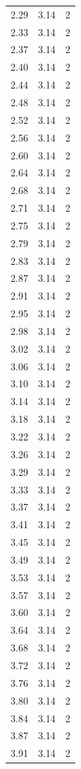 \begin{longtable}{lrr}
  2.29 & 3.14 & 2 \\
  2.33 & 3.14 & 2 \\
  2.37 & 3.14 & 2 \\
  2.40 & 3.14 & 2 \\
  2.44 & 3.14 & 2 \\
  2.48 & 3.14 & 2 \\
  2.52 & 3.14 & 2 \\
  2.56 & 3.14 & 2 \\
  2.60 & 3.14 & 2 \\
  2.64 & 3.14 & 2 \\
  2.68 & 3.14 & 2 \\
  2.71 & 3.14 & 2 \\
  2.75 & 3.14 & 2 \\
  2.79 & 3.14 & 2 \\
  2.83 & 3.14 & 2 \\
  2.87 & 3.14 & 2 \\
  2.91 & 3.14 & 2 \\
  2.95 & 3.14 & 2 \\
  2.98 & 3.14 & 2 \\
  3.02 & 3.14 & 2 \\
  3.06 & 3.14 & 2 \\
  3.10 & 3.14 & 2 \\
  3.14 & 3.14 & 2 \\
  3.18 & 3.14 & 2 \\
  3.22 & 3.14 & 2 \\
  3.26 & 3.14 & 2 \\
  3.29 & 3.14 & 2 \\
  3.33 & 3.14 & 2 \\
  3.37 & 3.14 & 2 \\
  3.41 & 3.14 & 2 \\
  3.45 & 3.14 & 2 \\
  3.49 & 3.14 & 2 \\
  3.53 & 3.14 & 2 \\
  3.57 & 3.14 & 2 \\
  3.60 & 3.14 & 2 \\
  3.64 & 3.14 & 2 \\
  3.68 & 3.14 & 2 \\
  3.72 & 3.14 & 2 \\
  3.76 & 3.14 & 2 \\
  3.80 & 3.14 & 2 \\
  3.84 & 3.14 & 2 \\
  3.87 & 3.14 & 2 \\
  3.91 & 3.14 & 2 \\

\end{longtable}
